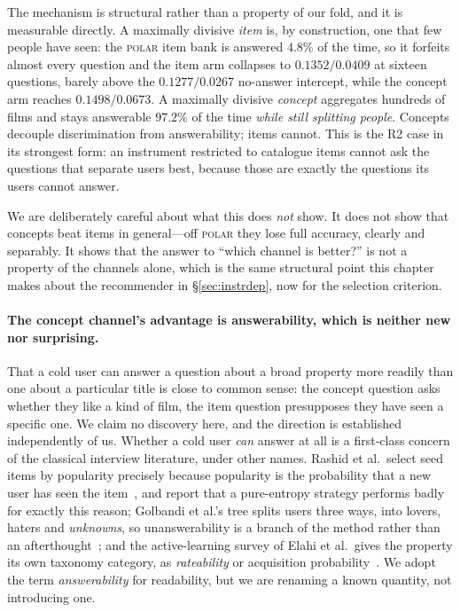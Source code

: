 \documentclass[11pt]{article}
\begin{document}
The mechanism is structural rather than a property of our fold, and it is measurable directly. A
maximally divisive \emph{item} is, by construction, one that few people have seen: the \textsc{polar}
item bank is answered $4.8\%$ of the time, so it forfeits almost every question and the item arm collapses
to $0.1352/0.0409$ at sixteen questions, barely above the $0.1277/0.0267$ no-answer intercept, while the
concept arm reaches $0.1498/0.0673$. A
maximally divisive \emph{concept} aggregates hundreds of films and stays answerable $97.2\%$ of the time
\emph{while still splitting people}. Concepts decouple discrimination from answerability; items cannot.
This is the R2 case in its strongest form: an instrument restricted to catalogue items cannot ask the
questions that separate users best, because those are exactly the questions its users cannot answer.

We are deliberately careful about what this does \emph{not} show. It does not show that concepts beat
items in general---off \textsc{polar} they lose full accuracy, clearly and separably. It shows that the
answer to ``which channel is better?'' is not a property of the channels alone, which is the same
structural point this chapter makes about the recommender in \S\ref{sec:instrdep}, now for the selection
criterion.

\paragraph{The concept channel's advantage is answerability, which is neither new nor surprising.}\label{sec:answerability}
That a cold user can answer a question about a broad property more readily than one about a particular
title is close to common sense: the concept question asks whether they like a kind of film, the item
question presupposes they have seen a specific one. We claim no discovery here, and the direction is
established independently of us. Whether a cold user \emph{can} answer at all is a first-class
concern of the classical interview literature, under other names. Rashid et al.\ select seed items by
popularity precisely because popularity is the probability that a new user has seen the
item~\cite{rashid2002getting}, and report that a pure-entropy strategy performs badly for exactly this
reason; Golbandi et al.'s tree splits users three ways, into lovers, haters and \emph{unknowns},
so unanswerability is a branch of the method rather than an
afterthought~\cite{golbandi2011adaptive}; and the active-learning survey of Elahi et al.\ gives the
property its own taxonomy category, as \emph{rateability} or acquisition
probability~\cite{elahi2016survey}. We adopt the term \emph{answerability} for readability, but we are
renaming a known quantity, not introducing one.
\end{document}
